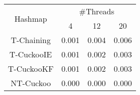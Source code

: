 \begin{tabular}{|c|c|c|c|}
\hline
\multirow{2}{*}{Hashmap} & \multicolumn{3}{c|}{\#Threads}\\\cline{2-4}& 4 & 12 & 20\\
\hline
\hline
T-Chaining & 0.001 & 0.004 & 0.006\\
T-CuckooIE & 0.001 & 0.002 & 0.003\\
T-CuckooKF & 0.001 & 0.002 & 0.003\\
NT-Cuckoo & 0.000 & 0.000 & 0.000\\
\hline
\end{tabular}
